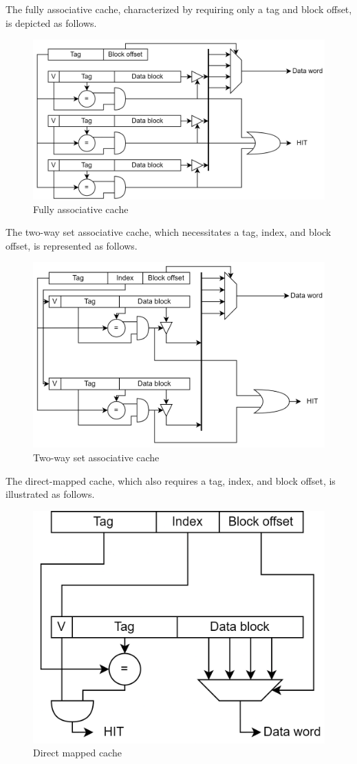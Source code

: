 The fully associative cache, characterized by requiring only a tag and block offset, is depicted as follows.
\begin{figure}[H]
    \centering
    \includegraphics[width=0.75\linewidth]{images/fas.png} 
    \caption{Fully associative cache}
\end{figure}
The two-way set associative cache, which necessitates a tag, index, and block offset, is represented as follows.
\begin{figure}[H]
    \centering
    \includegraphics[width=0.75\linewidth]{images/twsas.png}
    \caption{Two-way set associative cache}
\end{figure}
The direct-mapped cache, which also requires a tag, index, and block offset, is illustrated as follows.
\begin{figure}[H]
    \centering
    \includegraphics[width=0.5\linewidth]{images/dms.png}
    \caption{Direct mapped cache}
\end{figure}

